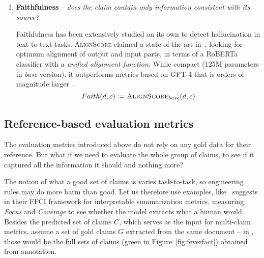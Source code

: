 \begin{enumerate}
    

    \item \textbf{Faithfulness} -- \textit{does the claim contain only information consistent with its source?}
    
    Faithfulness has been extensively studied on its own to detect hallucination in text-to-text tasks. \textsc{AlignScore} claimed a state of the art in~\citealt{zha-etal-2023-alignscore}, looking for optimum alignment of output and input parts, in terms of a RoBERTa~\cite{liu2019roberta} classifier with a \textit{unified alignment function}.
    While compact (125M parameters in \textit{base} version), it outperforms metrics based on GPT-4 that is orders of magnitude larger~\cite{zha-etal-2023-alignscore}.
    $$Faith(d,c) := \textsc{AlignScore}_{base}(d,c)$$

\end{enumerate}

\subsection{Reference-based evaluation metrics}\label{reference-based}
The evaluation metrics introduced above do not rely on any gold data for their reference.
But what if we need to evaluate the whole group of claims, to see if it captured all the information it should and nothing more?

The notion of what a good set of claims is varies task-to-task, so engineering rules may do more harm than good.
Let us therefore use examples, like~\citealt{ffci} suggests in their FFCI framework for interpretable summarization metrics, measuring \textit{Focus} and \textit{Coverage} to see whether the model extracts what a human would.
Besides the predicted set of claims $C$, which serves as the input for multi-claim metrics, assume a set of gold claims $G$ extracted from the same document -- in \ds{}, those would be the full sets of claims (green in Figure~\ref{fig:feverfact}) obtained from annotation.

